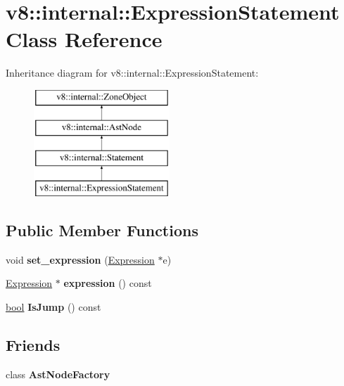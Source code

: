 \hypertarget{classv8_1_1internal_1_1ExpressionStatement}{}\section{v8\+:\+:internal\+:\+:Expression\+Statement Class Reference}
\label{classv8_1_1internal_1_1ExpressionStatement}
Inheritance diagram for v8\+:\+:internal\+:\+:Expression\+Statement\+:\begin{figure}[H]
\begin{center}
\leavevmode
\includegraphics[height=4.000000cm]{classv8_1_1internal_1_1ExpressionStatement}
\end{center}
\end{figure}
\subsection*{Public Member Functions}
\begin{DoxyCompactItemize}
\item 
\mbox{\label{classv8_1_1internal_1_1ExpressionStatement_a38f6198429fb2be06a092e53d458d977}} 
void {\bfseries set\+\_\+expression} (\mbox{\hyperlink{classv8_1_1internal_1_1Expression}{Expression}} $\ast$e)
\item 
\mbox{\label{classv8_1_1internal_1_1ExpressionStatement_a4cfaa118a724d5c6882a9a72a77a3fdf}} 
\mbox{\hyperlink{classv8_1_1internal_1_1Expression}{Expression}} $\ast$ {\bfseries expression} () const
\item 
\mbox{\label{classv8_1_1internal_1_1ExpressionStatement_a8dd923e55a6e0b95caf0770f34dab8ba}} 
\mbox{\hyperlink{classbool}{bool}} {\bfseries Is\+Jump} () const
\end{DoxyCompactItemize}
\subsection*{Friends}
\begin{DoxyCompactItemize}
\item 
\mbox{\label{classv8_1_1internal_1_1ExpressionStatement_a8d587c8ad3515ff6433eb83c578e795f}} 
class {\bfseries Ast\+Node\+Factory}
\end{DoxyCompactItemize}
